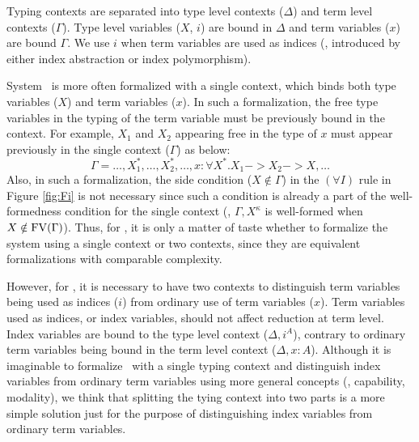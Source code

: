 Typing contexts are separated into type level contexts ($\Delta$) and
term level contexts ($\Gamma$). Type level variables ($X$, $i$) are
bound in $\Delta$ and term variables ($x$) are bound $\Gamma$.
We use $i$ when term variables are used as indices (\ie, introduced by
either index abstraction or index polymorphism).

System \Fw\ is more often formalized with a single context, which
binds both type variables ($X$) and term variables ($x$).
In such a formalization, the free type variables in the typing of
the term variable must be previously bound in the context. For example,
$X_1$ and $X_2$ appearing free in the type of $x$ must appear previously
in the single context ($\Gamma$) as below:
\[ \Gamma = \dots,X_1^{*},\dots,X_2^{*},\dots,
		x:\forall X^{*}.X_1 -> X_2 -> X,\dots \]
Also, in such a formalization, the side condition ($X\notin\Gamma$)
in the $(\forall I)$ rule in Figure \ref{fig:Fi} is not necessary
since such a condition is already a part of the well-formedness condition
for the single context (\ie, $\Gamma,X^\kappa$ is well-formed when
$X\notin\mathop{\mathrm{FV}}(\Gamma)$). Thus, for \Fw, it is only a matter of taste
whether to formalize the system using a single context or two contexts,
since they are equivalent formalizations with comparable complexity.

However, for \Fi, it is necessary to have two contexts to distinguish
term variables being used as indices ($i$) from ordinary use of
term variables ($x$). Term variables used as indices, or index variables,
should not affect reduction at term level.
Index variables are bound to the type level context ($\Delta,i^A$),
contrary to ordinary term variables being bound
in the term level context ($\Delta,x:A$).
Although it is imaginable to formalize \Fi\ with a single typing context
and distinguish index variables from ordinary term variables using
more general concepts (\eg, capability, modality), we think that splitting
the tying context into two parts is a more simple solution just for
the purpose of distinguishing index variables from ordinary term variables.

